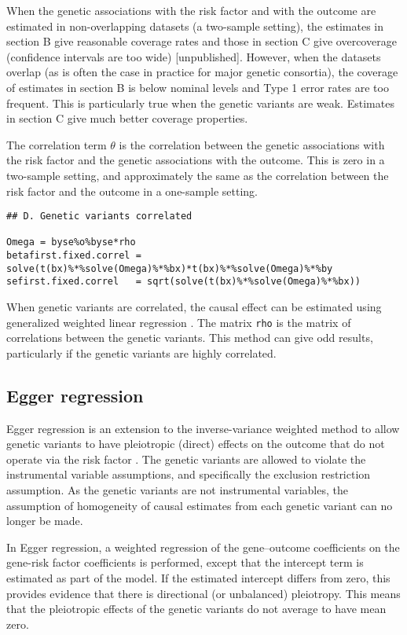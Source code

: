 \documentclass[a4paper,12pt]{article} %
\begin{document}
When the genetic associations with the risk factor and with the outcome are estimated in non-overlapping datasets (a two-sample setting), the estimates in section B give reasonable coverage rates and those in section C give overcoverage (confidence intervals are too wide) [unpublished]. However, when the datasets overlap (as is often the case in practice for major genetic consortia), the coverage of estimates in section B is below nominal levels and Type 1 error rates are too frequent. This is particularly true when the genetic variants are weak. Estimates in section C give much better coverage properties.

The correlation term $\theta$ is the correlation between the genetic associations with the risk factor and the genetic associations with the outcome. This is zero in a two-sample setting, and approximately the same as the correlation between the risk factor and the outcome in a one-sample setting.

\begin{lstlisting}
## D. Genetic variants correlated

Omega = byse%o%byse*rho
betafirst.fixed.correl = solve(t(bx)%*%solve(Omega)%*%bx)*t(bx)%*%solve(Omega)%*%by
sefirst.fixed.correl   = sqrt(solve(t(bx)%*%solve(Omega)%*%bx))
\end{lstlisting}

When genetic variants are correlated, the causal effect can be estimated using generalized weighted linear regression \citep{burgess2015scoretj}. The matrix \texttt{rho} is the matrix of correlations between the genetic variants. This method can give odd results, particularly if the genetic variants are highly correlated.

\clearpage

\subsection{Egger regression}
Egger regression is an extension to the inverse-variance weighted method to allow genetic variants to have pleiotropic (direct) effects on the outcome that do not operate via the risk factor \citep{bowden2015}. The genetic variants are allowed to violate the instrumental variable assumptions, and specifically the exclusion restriction assumption. As the genetic variants are not instrumental variables, the assumption of homogeneity of causal estimates from each genetic variant can no longer be made.

In Egger regression, a weighted regression of the gene--outcome coefficients on the gene-risk factor coefficients is performed, except that the intercept term is estimated as part of the model. If the estimated intercept differs from zero, this provides evidence that there is directional (or unbalanced) pleiotropy. This means that the pleiotropic effects of the genetic variants do not average to have mean zero.
\end{document}
